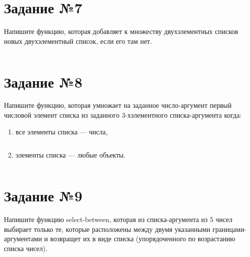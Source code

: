 \section{Задание №7}

Напишите функцию, которая добавляет к множеству двухэлементных списков
новых двухэлементный список, если его там нет.

\vspace{4mm}
\begin{minipage}{0.92\linewidth}
\begin{lstlisting}
\end{lstlisting}
\end{minipage}

\section{Задание №8}

Напишите функцию, которая умножает на заданное число-аргумент первый
числовой элемент списка из заданного 3-хэлементного списка-аргумента
когда:

\begin{enumerate}
    \item все элементы списка --- числа,

\vspace{4mm}
\begin{minipage}{0.92\linewidth}
\begin{lstlisting}
\end{lstlisting}
\end{minipage}

    \item элементы списка --- любые объекты.

\vspace{4mm}
\begin{minipage}{0.92\linewidth}
\begin{lstlisting}
\end{lstlisting}
\end{minipage}

\end{enumerate}

\section{Задание №9}

Напишите функцию select-between, которая из списка-аргумента из 5 чисел
выбирает только те, которые расположены между двумя указанными
границами-аргументами и возвращет их в виде списка (упорядоченного по
возрастанию списка чисел).


